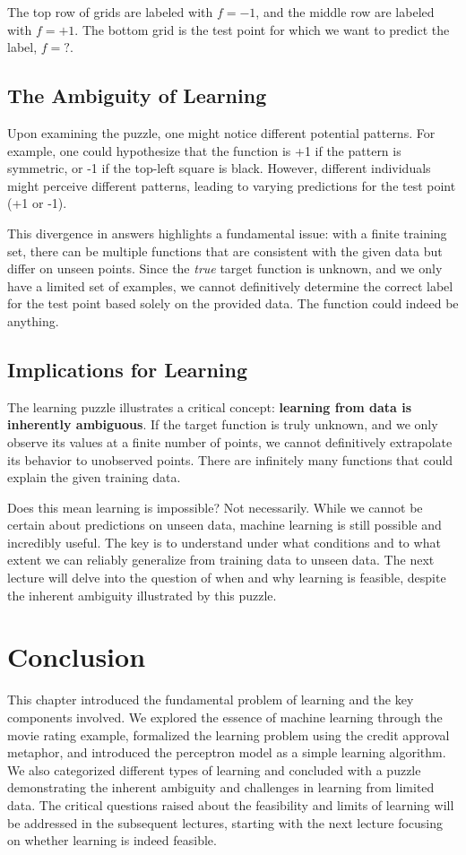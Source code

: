 \documentclass{article}
\begin{document}
The top row of grids are labeled with $f=-1$, and the middle row are labeled with $f=+1$. The bottom grid is the test point for which we want to predict the label, $f = ?$.

\subsection{The Ambiguity of Learning}
Upon examining the puzzle, one might notice different potential patterns. For example, one could hypothesize that the function is +1 if the pattern is symmetric, or -1 if the top-left square is black.  However, different individuals might perceive different patterns, leading to varying predictions for the test point (+1 or -1).

This divergence in answers highlights a fundamental issue: with a finite training set, there can be multiple functions that are consistent with the given data but differ on unseen points. Since the \textit{true} target function is unknown, and we only have a limited set of examples, we cannot definitively determine the correct label for the test point based solely on the provided data.  The function could indeed be anything.

\subsection{Implications for Learning}
The learning puzzle illustrates a critical concept: \textbf{learning from data is inherently ambiguous}. If the target function is truly unknown, and we only observe its values at a finite number of points, we cannot definitively extrapolate its behavior to unobserved points.  There are infinitely many functions that could explain the given training data.

Does this mean learning is impossible?  Not necessarily.  While we cannot be certain about predictions on unseen data, machine learning is still possible and incredibly useful. The key is to understand under what conditions and to what extent we can reliably generalize from training data to unseen data. The next lecture will delve into the question of when and why learning is feasible, despite the inherent ambiguity illustrated by this puzzle.

\section{Conclusion}
This chapter introduced the fundamental problem of learning and the key components involved. We explored the essence of machine learning through the movie rating example, formalized the learning problem using the credit approval metaphor, and introduced the perceptron model as a simple learning algorithm.  We also categorized different types of learning and concluded with a puzzle demonstrating the inherent ambiguity and challenges in learning from limited data.  The critical questions raised about the feasibility and limits of learning will be addressed in the subsequent lectures, starting with the next lecture focusing on whether learning is indeed feasible.
\end{document}
